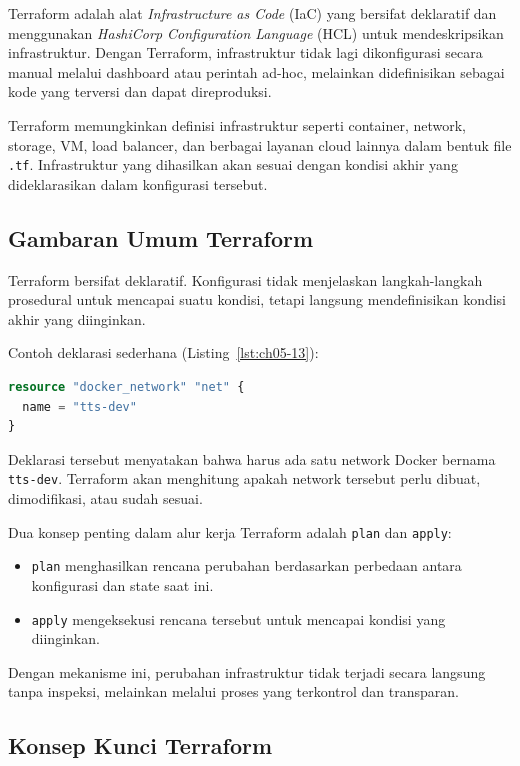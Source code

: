 Terraform adalah alat \textit{Infrastructure as Code} (IaC) yang bersifat deklaratif dan menggunakan \textit{HashiCorp Configuration Language} (HCL) untuk mendeskripsikan infrastruktur. Dengan Terraform, infrastruktur tidak lagi dikonfigurasi secara manual melalui dashboard atau perintah ad-hoc, melainkan didefinisikan sebagai kode yang terversi dan dapat direproduksi.

Terraform memungkinkan definisi infrastruktur seperti container, network, storage, VM, load balancer, dan berbagai layanan cloud lainnya dalam bentuk file \texttt{.tf}. Infrastruktur yang dihasilkan akan sesuai dengan kondisi akhir yang dideklarasikan dalam konfigurasi tersebut.

\subsection{Gambaran Umum Terraform}

Terraform bersifat deklaratif. Konfigurasi tidak menjelaskan langkah-langkah prosedural untuk mencapai suatu kondisi, tetapi langsung mendefinisikan kondisi akhir yang diinginkan.

Contoh deklarasi sederhana (Listing~\ref{lst:ch05-13}):

\begin{lstlisting}[language=terraform, caption={Potongan kode Terraform pada Gambaran Umum Terraform}, label={lst:ch05-13}]
resource "docker_network" "net" {
  name = "tts-dev"
}
\end{lstlisting}

Deklarasi tersebut menyatakan bahwa harus ada satu network Docker bernama \texttt{tts-dev}. Terraform akan menghitung apakah network tersebut perlu dibuat, dimodifikasi, atau sudah sesuai.

Dua konsep penting dalam alur kerja Terraform adalah \texttt{plan} dan \texttt{apply}:

\begin{itemize}
\item \texttt{plan} menghasilkan rencana perubahan berdasarkan perbedaan antara konfigurasi dan state saat ini.
\item \texttt{apply} mengeksekusi rencana tersebut untuk mencapai kondisi yang diinginkan.
\end{itemize}

Dengan mekanisme ini, perubahan infrastruktur tidak terjadi secara langsung tanpa inspeksi, melainkan melalui proses yang terkontrol dan transparan.

\subsection{Konsep Kunci Terraform}

